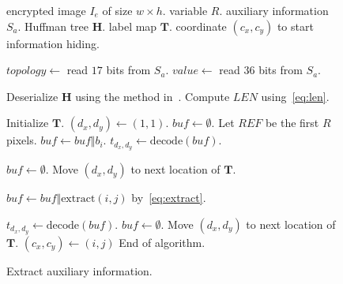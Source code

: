 \documentclass{elsarticle}
\begin{document}
	\begin{figure}[!t]
		\begin{algorithm}[H]
			\caption{Extract auxiliary information.}
			\label{algo:extractA}
			
			\begin{algorithmic}[1]
				\Require encrypted image \(I_e\) of size \(w \times h\).
				\Require variable \(R\).
				\Ensure auxiliary information \(S_a\).
				\Ensure Huffman tree \(\mathbf{H}\).
				\Ensure label map \(\mathbf{T}\).
				\Ensure coordinate \((c_x, c_y)\) to start information hiding.
				
				\State \(topology \gets\) read \(17\) bits from \(S_a\).
				\State \(value \gets\) read \(36\) bits from \(S_a\).

				\State Deserialize \(\mathbf{H}\) using the method in~\cite{Pu2006}.
				\State Compute \(LEN\) using~\eqref{eq:len}.
				
				\State Initialize \(\mathbf{T}\).
				\State \((d_x, d_y) \gets (1, 1)\).	
				\label{algo:extractT:idxProce}
				\State \(buf \gets \emptyset\).
				\State Let \(REF\) be the first \(R\) pixels.
				\label{algo:extractT:loop}
				\State	\(buf \gets buf \Vert b_i\).
				\State 		\(t_{d_x, d_y} \gets \mathrm{decode}(buf)\).		
				\label{algo:extractT:incdref} 

				\State 		\(buf \gets \emptyset\).
				\State		Move \((d_x, d_y)\) to next location of \(\mathbf{T}\).
				
				\EndIf
				\EndFor
				
				\label{algo:extractT:idxExt}
				\State 	\(buf \gets buf \Vert \mathrm{extract}(i, j)\) by~\eqref{eq:extract}. 
				\label{algo:extractT:nextij}
				
				\State 		\(t_{d_x, d_y} \gets \mathrm{decode}(buf)\). 
				\label{algo:extractT:nextd} 
				\State 		\(buf \gets \emptyset\).
				\State		Move \((d_x, d_y)\) to next location of \(\mathbf{T}\).
				\State			\((c_x, c_y) \gets (i, j)\)
				\State 			End of algorithm.
				\EndIf
				
				\EndIf
				\EndFor
			\end{algorithmic}
		\end{algorithm}
	\end{figure}
	
\end{document}
